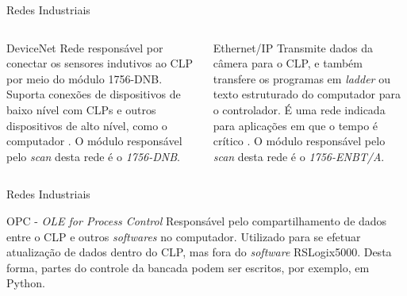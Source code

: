 \documentclass[10pt]{beamer}
\begin{document}
\begin{frame}[fragile]{Redes Industriais}
\begin{columns}[T]
\begin{column}{.5\textwidth}
\begin{block}{DeviceNet}
Rede responsável por conectar os sensores indutivos ao CLP por meio do módulo 1756-DNB. Suporta conexões de dispositivos de baixo nível com CLPs e outros dispositivos de alto nível, como o computador \cite{devicenetrockwell}. O módulo responsável pelo \textit{scan} desta rede é o \textit{1756-DNB}.
\end{block}
\end{column}

\begin{column}{.5\textwidth}
\begin{block}{Ethernet/IP}
Transmite dados da câmera para o CLP, e também transfere os programas em \textit{ladder} ou texto estruturado do computador para o controlador. É uma rede indicada para aplicações em que o tempo é crítico \cite{eiprockwell}. O módulo responsável pelo \textit{scan} desta rede é o \textit{1756-ENBT/A}.
\end{block}
\end{column}

\end{columns}
\end{frame}

\begin{frame}[fragile]{Redes Industriais}
\begin{block}{OPC - \textit{OLE for Process Control}}
Responsável pelo compartilhamento de dados entre o CLP e outros \textit{softwares} no computador. Utilizado para se efetuar atualização de dados dentro do CLP, mas fora do \textit{software} RSLogix5000. Desta forma, partes do controle da bancada podem ser escritos, por exemplo, em Python.
\end{block}
\end{frame}
\end{document}

